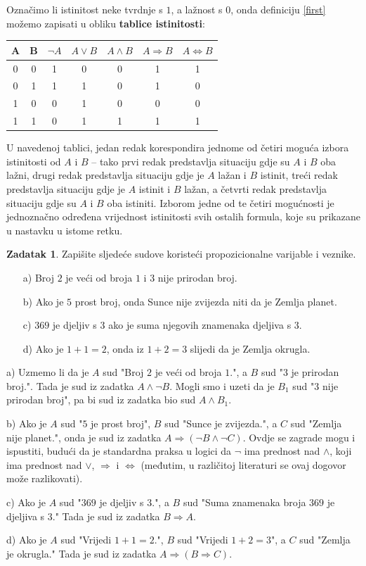 \documentclass{book}
\renewenvironment{proof}{%
    \vspace{-\parskip}\begin{oldproof}%
    }{%
    \end{oldproof}%
}
\theoremstyle{definition}
\theoremstyle{definition}
\newtheorem{exercise}{Zadatak}
\theoremstyle{remark}
\begin{document}
Označimo li istinitost neke tvrdnje s $1$, a lažnost s $0$, onda definiciju \ref{first} možemo zapisati u obliku \textbf{tablice istinitosti}:
\begin{center}
\begin{tabular}{ |c|c||c|c|c|c|c| } 
 \hline
 A & B & $\neg A$ & $A\vee B$ & $A\wedge B$ & $A\Rightarrow B$ & $A \Leftrightarrow B$ \\
 \hline \hline
 0 & 0 & 1 & 0 & 0 & 1 & 1 \\ 
 0 & 1 & 1 & 1 & 0 & 1 & 0 \\ 
 1 & 0 & 0 & 1 & 0 & 0 & 0 \\
 1 & 1 & 0 & 1 & 1 & 1 & 1 \\
 \hline
\end{tabular}
\end{center}
U navedenoj tablici, jedan redak korespondira jednome od četiri moguća izbora istinitosti od $A$ i $B$ -- tako prvi redak predstavlja situaciju gdje su $A$ i $B$ oba lažni, drugi redak predstavlja situaciju gdje je $A$ lažan i $B$ istinit, treći redak predstavlja situaciju gdje je $A$ istinit i $B$ lažan, a četvrti redak predstavlja situaciju gdje su $A$ i $B$ oba istiniti. Izborom jedne od te četiri mogućnosti je jednoznačno određena vrijednost istinitosti svih ostalih formula, koje su prikazane u nastavku u istome retku.
\begin{exercise}
Zapišite sljedeće sudove koristeći propozicionalne varijable i veznike.
\begin{itemize}
\item[a)] Broj $2$ je veći od broja $1$ i $3$ nije prirodan broj.
\item[b)] Ako je $5$ prost broj, onda Sunce nije zvijezda niti da je Zemlja planet.
\item[c)] $369$ je djeljiv s $3$ ako je suma njegovih znamenaka djeljiva s $3$.
\item[d)] Ako je $1+1=2$, onda iz $1+2=3$ slijedi da je Zemlja okrugla.
\end{itemize}
\end{exercise}
\begin{proof}[Rješenje]
a) Uzmemo li da je $A$ sud "Broj $2$ je veći od broja $1$.", a $B$ sud "$3$ je prirodan broj.". Tada je sud iz zadatka $A\wedge \neg B$. Mogli smo i uzeti da je $B_1$ sud "$3$ nije prirodan broj", pa bi sud iz zadatka bio sud $A\wedge B_1$.

b) Ako je $A$ sud "$5$ je prost broj", $B$ sud "Sunce je zvijezda.", a $C$ sud "Zemlja nije planet.", onda je sud iz zadatka $A\Rightarrow (\neg B\wedge \neg C)$. Ovdje se zagrade mogu i ispustiti, budući da je standardna praksa u logici da $\neg$ ima prednost nad $\wedge$, koji ima prednost nad $\vee$, $\Rightarrow$ i $\Leftrightarrow$ (međutim, u različitoj literaturi se ovaj dogovor može razlikovati).

c) Ako je $A$ sud "$369$ je djeljiv s $3$.", a $B$ sud "Suma znamenaka broja $369$ je djeljiva s $3$." Tada je sud iz zadatka $B\Rightarrow A$.

d) Ako je $A$ sud "Vrijedi $1+1=2$.", $B$ sud "Vrijedi $1+2=3$", a $C$ sud "Zemlja je okrugla." Tada je sud iz zadatka $A\Rightarrow(B\Rightarrow C)$.
\end{proof}
\end{document}
